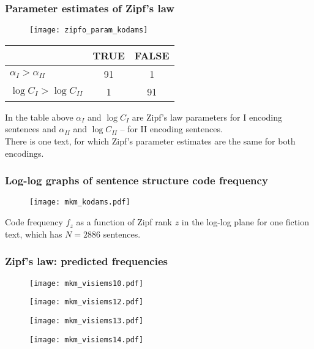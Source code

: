 \documentclass{beamer}
\begin{document}
\begin{frame}
%
\frametitle{Parameter estimates of Zipf's law}
%
{
 \begin{figure}[h!]
 \centering
 \texttt{[image: zipfo\_param\_kodams]}
 \end{figure}
}
%
{
 \begin{table}[]
 \centering
 \begin{tabular}{lcc}
 \toprule
         & TRUE & FALSE    \\ \midrule
 $\alpha_I > \alpha_{II}$ & 91        & 1 \\ 
 $\log C_I > \log C_{II}$ & 1        & 91      \\ 
 \bottomrule
 \end{tabular}
 \end{table}
 \bigskip
In the table above $\alpha_I$ and $\log C_I$ are Zipf's law parameters for 
I encoding sentences and $\alpha_{II}$ and $\log C_{II}$ -- for II encoding 
sentences.\\
%
\bigskip
%
There is one text, for which Zipf's parameter estimates are the same for both encodings.
}
%
\end{frame}


\begin{frame}
\frametitle{Log-log graphs of sentence structure code frequency}
%
\begin{figure}[h!]
\centering
\texttt{[image: mkm\_kodams.pdf]}
\end{figure}
%
Code frequency $f_z$ as a function of Zipf rank $z$ in the log-log plane for 
one fiction text, which has $N = 2886$ sentences.
%
\end{frame}



\begin{frame}
\frametitle{Zipf's law: predicted frequencies}
%
{
 \begin{figure}[h!]
 \centering
 \texttt{[image: mkm\_visiems10.pdf]}
 \end{figure}
}
%
{
 \begin{figure}[h!]
 \centering
 \texttt{[image: mkm\_visiems12.pdf]}
 \end{figure}
}
%
{
 \begin{figure}[h!]
 \centering
 \texttt{[image: mkm\_visiems13.pdf]}
 \end{figure}
}
%
{
 \begin{figure}[h!]
 \centering
 \texttt{[image: mkm\_visiems14.pdf]}
 \end{figure}
}
\end{frame}
\end{document}
